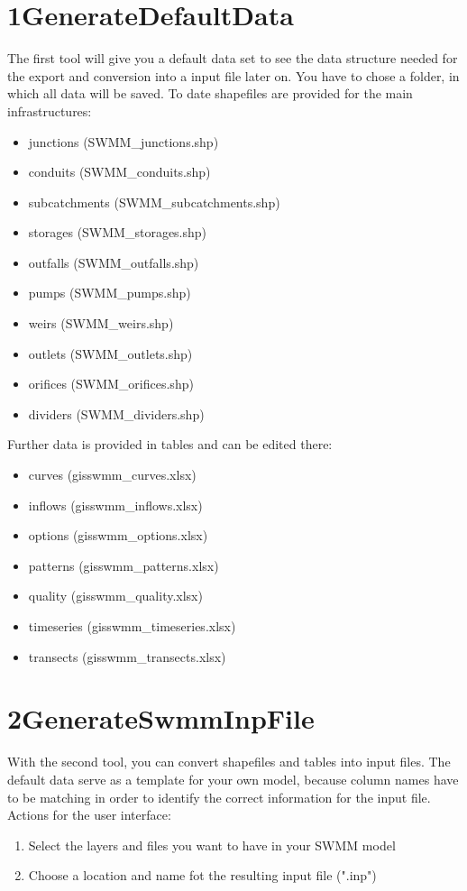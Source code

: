 \documentclass[10pt,a4paper,oneside]{scrbook}
\begin{document}
\section{1\textunderscore GenerateDefaultData}
The first tool will give you a default data set to see the data structure needed for the export and conversion into a input file later on. You have to chose a folder, in which all data will be saved.  To date shapefiles are provided for the main infrastructures:
\begin{itemize}
	\setlength\itemsep{0pt}
    \item junctions (SWMM\_junctions.shp)
    \item conduits (SWMM\_conduits.shp)
    \item subcatchments (SWMM\_subcatchments.shp)
    \item storages (SWMM\_storages.shp)
    \item outfalls (SWMM\_outfalls.shp)
    \item pumps (SWMM\_pumps.shp)
    \item weirs (SWMM\_weirs.shp)
    \item outlets (SWMM\_outlets.shp)
    \item orifices (SWMM\_orifices.shp)
    \item dividers (SWMM\_dividers.shp)
\end{itemize}
Further data is provided in tables and can be edited there:
\begin{itemize}
	\setlength\itemsep{0pt}
    \item curves (gisswmm\_curves.xlsx)
    \item inflows (gisswmm\_inflows.xlsx)
    \item options (gisswmm\_options.xlsx)
    \item patterns (gisswmm\_patterns.xlsx)
    \item quality (gisswmm\_quality.xlsx)
    \item timeseries (gisswmm\_timeseries.xlsx)
    \item transects (gisswmm\_transects.xlsx)
\end{itemize}

\section{2\textunderscore GenerateSwmmInpFile}
With the second tool, you can convert shapefiles and tables into input files. The default data serve as a template for your own model, because column names have to be matching in order to identify the correct information for the input file. Actions for the user interface:
\begin{enumerate}
	\setlength\itemsep{0pt}
	\item Select the layers and files you want to have in your SWMM model
	\item Choose a location and name fot the resulting input file (".inp")
\end{enumerate}
\end{document}
